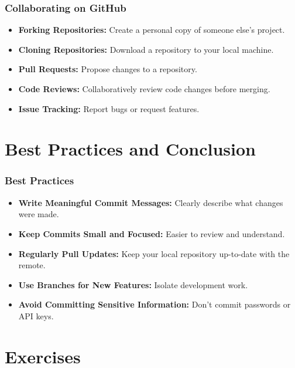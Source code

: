 \begin{frame}
	\frametitle{Collaborating on GitHub}
	\begin{itemize}
		\item \textbf{Forking Repositories:} Create a personal copy of someone else's project.
		\item \textbf{Cloning Repositories:} Download a repository to your local machine.
		\item \textbf{Pull Requests:} Propose changes to a repository.
		\item \textbf{Code Reviews:} Collaboratively review code changes before merging.
		\item \textbf{Issue Tracking:} Report bugs or request features.
	\end{itemize}
\end{frame}

\section{Best Practices and Conclusion}

\begin{frame}
	\frametitle{Best Practices}
	\begin{itemize}
		\item \textbf{Write Meaningful Commit Messages:} Clearly describe what changes were made.
		\item \textbf{Keep Commits Small and Focused:} Easier to review and understand.
		\item \textbf{Regularly Pull Updates:} Keep your local repository up-to-date with the remote.
		\item \textbf{Use Branches for New Features:} Isolate development work.
		\item \textbf{Avoid Committing Sensitive Information:} Don't commit passwords or API keys.
	\end{itemize}
\end{frame}

\section{Exercises}

